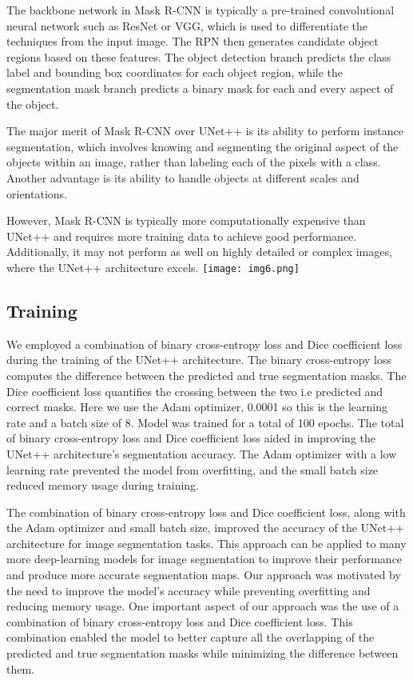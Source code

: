 \documentclass[conference]{IEEEtran}
\begin{document}
The backbone network in Mask R-CNN is typically a pre-trained convolutional neural network such as ResNet or VGG, which is used to differentiate the techniques from the input image. The RPN then generates candidate object regions based on these features. The object detection branch predicts the class label and bounding box coordinates for each object region, while the segmentation mask branch predicts a binary mask for each and every aspect of the object.

The major merit of Mask R-CNN over UNet++ is its ability to perform instance segmentation, which involves knowing and segmenting the original aspect of the  objects within an image, rather than labeling each of the pixels with a class. Another advantage is its ability to handle objects at different scales and orientations.

However, Mask R-CNN is typically more computationally expensive than UNet++ and requires more training data to achieve good performance. Additionally, it may not perform as well on highly detailed or complex images, where the UNet++ architecture excels.
\texttt{[image: img6.png]}

\subsection{ Training}\label{SCM}
We employed a combination of binary cross-entropy loss and Dice coefficient loss during the training of the UNet++ architecture. The binary cross-entropy loss computes the difference between the predicted and true segmentation masks. The Dice coefficient loss quantifies the crossing between the two i.e predicted and correct masks. Here we use the Adam optimizer, 0.0001 so this is the learning rate and a batch size of 8. Model was trained for a total of 100 epochs.
The total of binary cross-entropy loss and Dice coefficient loss aided in improving the UNet++ architecture's segmentation accuracy. The Adam optimizer with a low learning rate prevented the model from overfitting, and the small batch size reduced memory usage during training.

The combination of binary cross-entropy loss and Dice coefficient loss, along with the Adam optimizer and small batch size, improved the accuracy of the UNet++ architecture for image segmentation tasks. This approach can be applied to many more deep-learning models for image segmentation to improve their performance and produce more accurate segmentation maps.
Our approach was motivated by the need to improve the model's accuracy while preventing overfitting and reducing memory usage. One important aspect of our approach was the use of a combination of binary cross-entropy loss and Dice coefficient loss. This combination enabled the model to better capture all the overlapping of the predicted and true segmentation masks while minimizing the difference between them.
\end{document}
